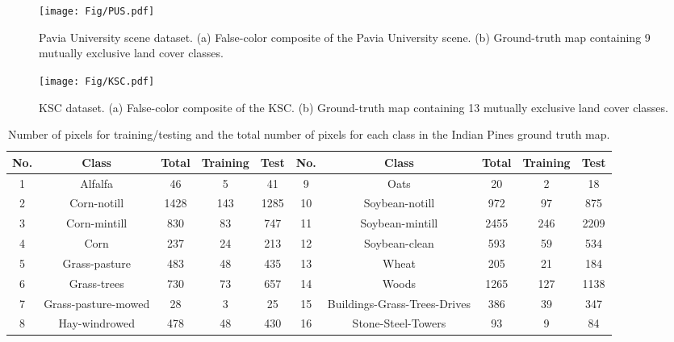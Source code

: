 \documentclass[12pt,onecolumn]{IEEEtran}
\begin{document}
\begin{spacing}{2}
\begin{figure}
  \centering
  \texttt{[image: Fig/PUS.pdf]}\\
  \caption{Pavia University scene dataset. (a) False-color composite of the Pavia University scene. (b) Ground-truth map containing 9 mutually exclusive land cover classes.}\label{PUS_show}
\end{figure}

\begin{figure}[htp]
  \centering
  \texttt{[image: Fig/KSC.pdf]}\\
  \caption{KSC dataset. (a) False-color composite of the KSC. (b) Ground-truth map containing 13 mutually exclusive land cover classes.}\label{KSC_show}
\end{figure}

\begin{table}\small
\centering
\caption{Number of pixels for training/testing and the total number of pixels for each class in the Indian Pines ground truth map.}
\label{IPT}
\begin{tabular}{|c|c|c|c|c|c|c|c|c|c|}
\hline
No.  &  Class                & Total       & Training  & Test  & No.  & Class                 & Total                  & Training & Test        \\ \hline
1    & Alfalfa               & 46          &   5       &  41   &  9   & Oats                   &  20                    & 2        &  18         \\\hline
2    & Corn-notill           & 1428        &   143     &  1285 &  10  & Soybean-notill         &  972                    & 97       &  875        \\\hline
3    & Corn-mintill          & 830         &   83      &  747  &  11  & Soybean-mintill        &   2455                  & 246      &  2209       \\\hline
4    & Corn                  & 237         &   24      &  213  &  12  & Soybean-clean           &   593                  & 59       &  534        \\\hline
5    & Grass-pasture         & 483         &   48      &  435  &  13  & Wheat                    &   205                  & 21       &  184        \\\hline
6    & Grass-trees           & 730         &   73      &  657  &  14  & Woods                     &   1265                & 127      &  1138    \\\hline
7    &  Grass-pasture-mowed  & 28          &   3       &  25   &  15  & Buildings-Grass-Trees-Drives&    386              & 39       &  347     \\\hline
8    & Hay-windrowed         & 478         &   48      &  430  &  16  & Stone-Steel-Towers       &    93                  & 9        &  84         \\ \hline
\end{tabular}
\end{table}


\end{spacing}
\end{document}
